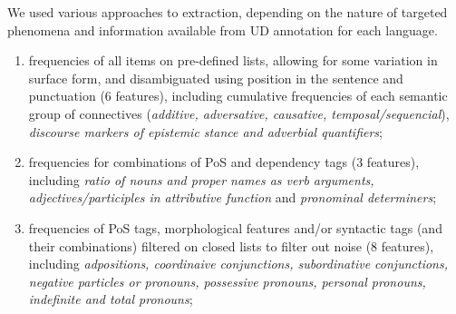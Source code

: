 We used various approaches to extraction, depending on the nature of targeted phenomena and information available from UD annotation for each language.
\begin{enumerate}\compresslist{}
	\item frequencies of all items on pre-defined lists, allowing for some variation in surface form, and disambiguated using position in the sentence and punctuation (6 features), including cumulative frequencies of each semantic group of connectives (\textit{additive, adversative, causative, temposal/sequencial}), \textit{discourse markers of epistemic stance and adverbial quantifiers};
	
	\item frequencies for combinations of PoS and dependency tags (3 features), including \textit{ratio of nouns and proper names as verb arguments, adjectives/participles in attributive function} and \textit{pronominal determiners};
	
	\item frequencies of PoS tags, morphological features and/or syntactic tags (and their combinations) filtered on closed lists to filter out noise (8 features), including \textit{adpositions, coordinaive conjunctions, subordinative conjunctions, negative particles or pronouns, possessive pronouns, personal pronouns, indefinite and total pronouns};
	

\end{enumerate}
